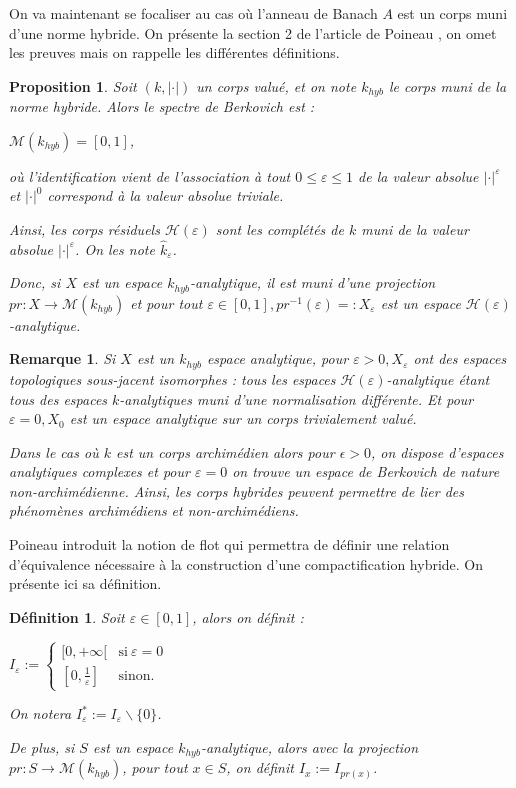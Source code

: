 \documentclass[11pt]{article}
\newtheorem{prop}[thm]{Proposition}
\newtheorem{defi}[thm]{Définition}
\newtheorem{rem}[thm]{Remarque}
\begin{document}
On va maintenant se focaliser au cas où l'anneau de Banach $A$ est un corps muni d'une norme hybride. On présente la section 2 de l'article de Poineau \cite{PoineauCompactificationHybride}, on omet les preuves mais on rappelle les différentes définitions.

\begin{prop}
Soit $(k, |\cdot|)$ un corps valué, et on note $k_{hyb}$ le corps muni de la norme hybride. Alors le spectre de Berkovich est :
\begin{center}
$\mathcal{M}(k_{hyb}) = [0,1]$,
\end{center} 
où l'identification vient de l'association à tout $0\leq \varepsilon \leq 1$ de la valeur absolue $|\cdot|^\varepsilon$ et $|\cdot|^0$ correspond à la valeur absolue triviale.

Ainsi, les corps résiduels $\mathcal{H}(\varepsilon)$ sont les complétés de $k$ muni de la valeur absolue $|\cdot|^\varepsilon$. On les note $\hat{k}_\varepsilon$.   

Donc, si $X$ est un espace $k_{hyb}$-analytique, il est muni d'une projection $pr : X \rightarrow \mathcal{M}(k_{hyb})$ et pour tout $\varepsilon \in [0,1], pr^{-1}(\varepsilon) =: X_\varepsilon$ est un espace $\mathcal{H}(\varepsilon)$-analytique. 
\end{prop} 

\begin{rem}
Si $X$ est un $k_{hyb}$ espace analytique, pour $\varepsilon > 0, X_\varepsilon$ ont des espaces topologiques sous-jacent isomorphes : tous les espaces $\mathcal{H}(\varepsilon)$-analytique étant tous des espaces $k$-analytiques muni d'une normalisation différente. Et pour $\varepsilon = 0, X_0$ est un espace analytique sur un corps trivialement valué.

Dans le cas où $k$ est un corps archimédien alors pour $\epsilon > 0$, on dispose d'espaces analytiques complexes et pour $\varepsilon = 0$ on trouve un espace de Berkovich de nature non-archimédienne. 
Ainsi, les corps hybrides peuvent permettre de lier des phénomènes archimédiens et non-archimédiens.   
\end{rem}

Poineau introduit la notion de flot qui permettra de définir une relation d'équivalence nécessaire à la construction d'une compactification hybride. On présente ici sa définition.

\begin{defi}
Soit $\varepsilon \in [0,1]$, alors on définit :
\begin{center}
$I_\varepsilon :=
		\begin{cases}
        [0, +\infty[ & \mathrm{si}~ \varepsilon = 0\\
        [0, \frac{1}{\varepsilon}] & \mathrm{sinon.}    
        \end{cases}$
\end{center}
On notera $I^*_\varepsilon := I_\varepsilon \backslash \lbrace 0 \rbrace$.

De plus, si $S$ est un espace $k_{hyb}$-analytique, alors avec la projection $pr : S \rightarrow \mathcal{M}(k_{hyb})$, pour tout $x\in S$, on définit $I_x := I_{pr(x)}$.
\end{defi}
\end{document}
